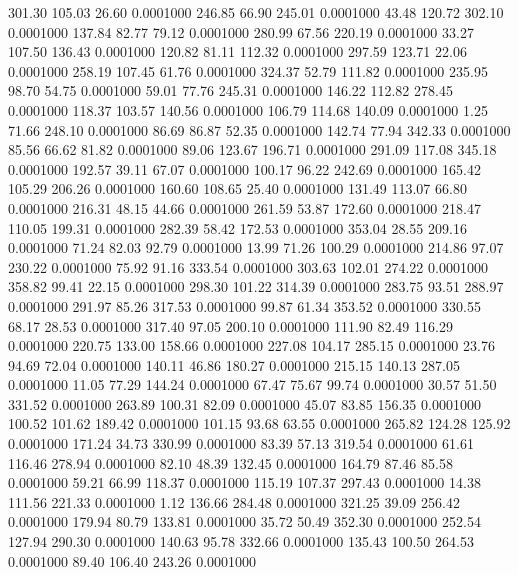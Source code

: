  301.30  105.03   26.60   0.0001000
 246.85   66.90  245.01   0.0001000
  43.48  120.72  302.10   0.0001000
 137.84   82.77   79.12   0.0001000
 280.99   67.56  220.19   0.0001000
  33.27  107.50  136.43   0.0001000
 120.82   81.11  112.32   0.0001000
 297.59  123.71   22.06   0.0001000
 258.19  107.45   61.76   0.0001000
 324.37   52.79  111.82   0.0001000
 235.95   98.70   54.75   0.0001000
  59.01   77.76  245.31   0.0001000
 146.22  112.82  278.45   0.0001000
 118.37  103.57  140.56   0.0001000
 106.79  114.68  140.09   0.0001000
   1.25   71.66  248.10   0.0001000
  86.69   86.87   52.35   0.0001000
 142.74   77.94  342.33   0.0001000
  85.56   66.62   81.82   0.0001000
  89.06  123.67  196.71   0.0001000
 291.09  117.08  345.18   0.0001000
 192.57   39.11   67.07   0.0001000
 100.17   96.22  242.69   0.0001000
 165.42  105.29  206.26   0.0001000
 160.60  108.65   25.40   0.0001000
 131.49  113.07   66.80   0.0001000
 216.31   48.15   44.66   0.0001000
 261.59   53.87  172.60   0.0001000
 218.47  110.05  199.31   0.0001000
 282.39   58.42  172.53   0.0001000
 353.04   28.55  209.16   0.0001000
  71.24   82.03   92.79   0.0001000
  13.99   71.26  100.29   0.0001000
 214.86   97.07  230.22   0.0001000
  75.92   91.16  333.54   0.0001000
 303.63  102.01  274.22   0.0001000
 358.82   99.41   22.15   0.0001000
 298.30  101.22  314.39   0.0001000
 283.75   93.51  288.97   0.0001000
 291.97   85.26  317.53   0.0001000
  99.87   61.34  353.52   0.0001000
 330.55   68.17   28.53   0.0001000
 317.40   97.05  200.10   0.0001000
 111.90   82.49  116.29   0.0001000
 220.75  133.00  158.66   0.0001000
 227.08  104.17  285.15   0.0001000
  23.76   94.69   72.04   0.0001000
 140.11   46.86  180.27   0.0001000
 215.15  140.13  287.05   0.0001000
  11.05   77.29  144.24   0.0001000
  67.47   75.67   99.74   0.0001000
  30.57   51.50  331.52   0.0001000
 263.89  100.31   82.09   0.0001000
  45.07   83.85  156.35   0.0001000
 100.52  101.62  189.42   0.0001000
 101.15   93.68   63.55   0.0001000
 265.82  124.28  125.92   0.0001000
 171.24   34.73  330.99   0.0001000
  83.39   57.13  319.54   0.0001000
  61.61  116.46  278.94   0.0001000
  82.10   48.39  132.45   0.0001000
 164.79   87.46   85.58   0.0001000
  59.21   66.99  118.37   0.0001000
 115.19  107.37  297.43   0.0001000
  14.38  111.56  221.33   0.0001000
   1.12  136.66  284.48   0.0001000
 321.25   39.09  256.42   0.0001000
 179.94   80.79  133.81   0.0001000
  35.72   50.49  352.30   0.0001000
 252.54  127.94  290.30   0.0001000
 140.63   95.78  332.66   0.0001000
 135.43  100.50  264.53   0.0001000
  89.40  106.40  243.26   0.0001000
